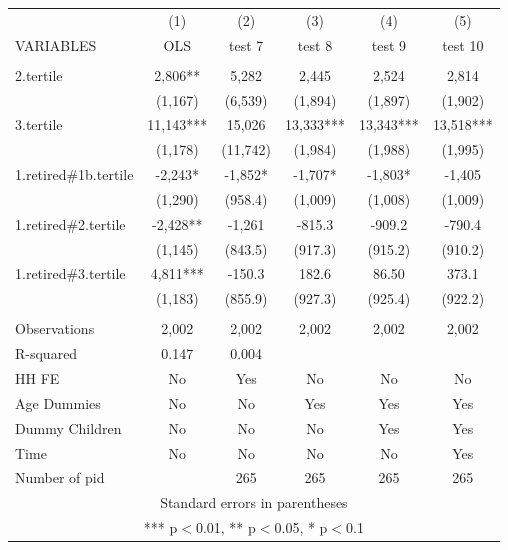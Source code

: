 \begin{tabular}{lccccc} \hline
 & (1) & (2) & (3) & (4) & (5) \\
VARIABLES & OLS & test 7 & test 8 & test 9 & test 10 \\ \hline
 &  &  &  &  &  \\
2.tertile & 2,806** & 5,282 & 2,445 & 2,524 & 2,814 \\
 & (1,167) & (6,539) & (1,894) & (1,897) & (1,902) \\
3.tertile & 11,143*** & 15,026 & 13,333*** & 13,343*** & 13,518*** \\
 & (1,178) & (11,742) & (1,984) & (1,988) & (1,995) \\
1.retired\#1b.tertile & -2,243* & -1,852* & -1,707* & -1,803* & -1,405 \\
 & (1,290) & (958.4) & (1,009) & (1,008) & (1,009) \\
1.retired\#2.tertile & -2,428** & -1,261 & -815.3 & -909.2 & -790.4 \\
 & (1,145) & (843.5) & (917.3) & (915.2) & (910.2) \\
1.retired\#3.tertile & 4,811*** & -150.3 & 182.6 & 86.50 & 373.1 \\
 & (1,183) & (855.9) & (927.3) & (925.4) & (922.2) \\
 &  &  &  &  &  \\
Observations & 2,002 & 2,002 & 2,002 & 2,002 & 2,002 \\
R-squared & 0.147 & 0.004 &  &  &  \\
HH FE & No & Yes & No & No & No \\
Age Dummies & No & No & Yes & Yes & Yes \\
Dummy Children & No & No & No & Yes & Yes \\
Time & No & No & No & No & Yes \\
 Number of pid &  & 265 & 265 & 265 & 265 \\ \hline
\multicolumn{6}{c}{ Standard errors in parentheses} \\
\multicolumn{6}{c}{ *** p$<$0.01, ** p$<$0.05, * p$<$0.1} \\
\end{tabular}
